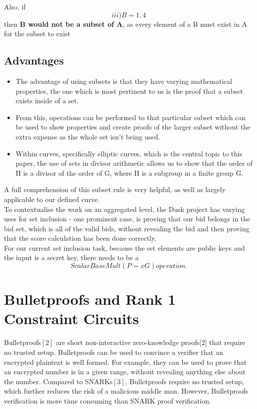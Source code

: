 \documentclass[letterpaper, 10 pt, conference]{ieeeconf}  %
\begin{document}
Also, if $$ iii) B={1,4} $$ then \textbf{B would not be a subset of A}, as every element of a B must exist in A for the subset to exist

\subsection{Advantages}
\begin{itemize}
    \item The advantage of using subsets is that they have varying mathematical properties, the one which is most pertinent to us is the proof that a subset exists inside of a set.
    \item From this, operations can be performed to that particular subset which can be used to show properties and create proofs of the larger subset without the extra expense as the whole set isn’t being used.
    \item Within curves, specifically elliptic curves, which is the central topic to this paper, the use of sets in divisor arithmetic allows us to show that the order of H is a divisor of the order of G, where H is a subgroup in a finite group G.
\end{itemize}
   A full comprehension of this subset rule is very helpful, as well as largely applicable to our defined curve. \\
   To contextualise the work on an aggregated level, the Dusk project has varying uses for set inclusion -  one prominent case, is proving that our bid belongs in the bid set, which is all of the valid bids, without revealing the bid and then proving that the score calculation has been done correctly. \\
   For our current set inclusion task, because the set elements are public keys and the input is a secret key, there needs to be a $$ ScalarBaseMult (P=xG) operation. $$ 
  


\section{Bulletproofs and Rank 1 Constraint Circuits} 
Bulletproofs$[2]$ are short non-interactive zero-knowledge proofs[2] that require no trusted setup. Bulletproofs can be used to convince a verifier that an encrypted plaintext is well formed. For example, they can be used to prove that an encrypted number is in a given range, without revealing anything else about the number. Compared to SNARKs$[3]$, Bulletproofs require no trusted setup, which further reduces the risk of a malicious middle man. However, Bulletproofs verification is more time consuming than SNARK proof verification.\\
\end{document}
